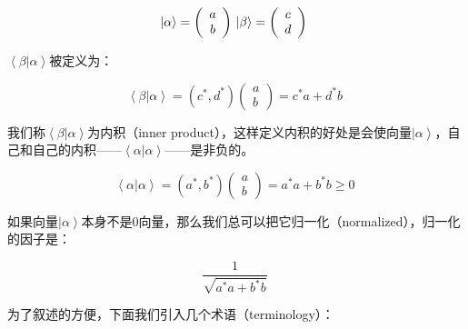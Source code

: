 \begin{equation}
\left| \alpha \right\rangle = \left( \begin{array}{ccc} a \\ b \end{array} \right)~ \\
\left| \beta \right\rangle = \left( \begin{array}{ccc} c \\ d \end{array} \right)~
\end{equation}

$\left\langle \beta | \alpha  \right\rangle$被定义为：

\begin{equation}
\left\langle \beta | \alpha  \right\rangle = \left( c^* , d^* \right) \left( \begin{array}{ccc}  a \\ b  \end{array}  \right) = c^* a + d^* b~
\end{equation}

我们称$\left\langle \beta | \alpha  \right\rangle$为内积（inner product），这样定义内积的好处是会使向量$\left| \alpha \right\rangle$，自己和自己的内积——$ \left\langle \alpha | \alpha  \right\rangle $——是非负的。

\begin{equation}
\left\langle \alpha | \alpha  \right\rangle = \left( a^* , b^* \right) \left( \begin{array}{ccc}  a \\ b  \end{array}  \right) = a^*a + b^* b \ge 0~
\end{equation}

如果向量$\left| \alpha \right\rangle$本身不是0向量，那么我们总可以把它归一化（normalized），归一化的因子是：

\begin{equation}
\frac{1}{\sqrt { a^* a + b^* b }}~
\end{equation}

为了叙述的方便，下面我们引入几个术语（terminology）：

